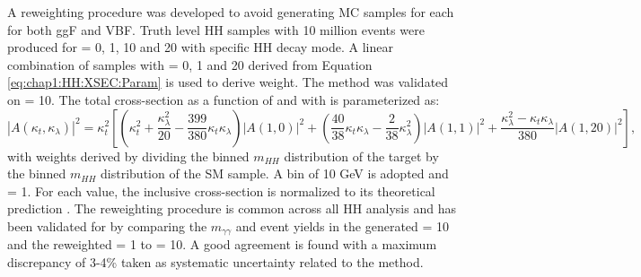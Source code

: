 A reweighting procedure was developed to avoid generating MC samples for each \kl for both ggF and VBF. Truth level HH samples with 10 million events were produced for \kl= 0, 1, 10 and 20 with specific HH decay mode. A linear combination of samples with \kl= 0, 1 and 20 derived from Equation \ref{eq:chap1:HH:XSEC:Param} is used to derive weight. The method was validated on \kl= 10. The total cross-section as a function of \kl and \kt with is parameterized as:
\begin{equation}
    \left|A\left(\kappa_{t}, \kappa_{\lambda}\right)\right|^{2}=\kappa_{t}^{2}\left[\left(\kappa_{t}^{2}+\frac{\kappa_{\lambda}^{2}}{20}-\frac{399}{380} \kappa_{t} \kappa_{\lambda}\right)|A(1,0)|^{2}+\left(\frac{40}{38} \kappa_{t} \kappa_{\lambda}-\frac{2}{38} \kappa_{\lambda}^{2}\right)|A(1,1)|^{2}+\frac{\kappa_{\lambda}^{2}-\kappa_{t} \kappa_{\lambda}}{380}|A(1,20)|^{2}\right],
\end{equation}
with weights derived by dividing the binned $m_{HH}$ distribution of the target \kl by the binned $m_{HH}$ distribution of the SM sample. A bin of 10 GeV is adopted and \kt= 1. For each \kl value, the inclusive cross-section is normalized to its theoretical prediction \cite{LHE}. The reweighting procedure is common across all HH analysis and has been validated for \HHyybb by comparing the $m_{\gamma\gamma}$ and event yields in the generated \kl= 10 and the reweighted \kl= 1 to \kl= 10. A good agreement is found with a maximum discrepancy of 3-4\% taken as systematic uncertainty related to the method.  \\ 


